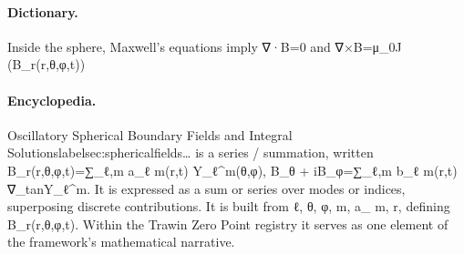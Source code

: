 \paragraph{Dictionary.}
Inside the sphere, Maxwell's equations imply ∇·B=0 and ∇×B=μ\_0J (B\_r(r,θ,φ,t))

\paragraph{Encyclopedia.}
Oscillatory Spherical Boundary Fields and Integral Solutionslabelsec:sphericalfields… is a series / summation, written B\_r(r,θ,φ,t)=∑\_ℓ,m a\_ℓ m(r,t) Y\_ℓ\textasciicircum{}m(θ,φ), B\_θ + iB\_φ=∑\_ℓ,m b\_ℓ m(r,t) ∇\_tanY\_ℓ\textasciicircum{}m. It is expressed as a sum or series over modes or indices, superposing discrete contributions. It is built from ℓ, θ, φ, m, a\_ m, r, defining B\_r(r,θ,φ,t). Within the Trawin Zero Point registry it serves as one element of the framework's mathematical narrative.
